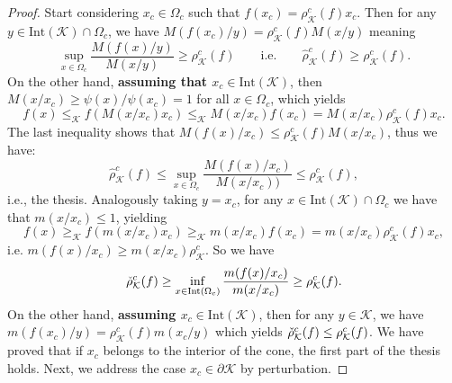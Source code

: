 \documentclass{article}
\newcommand{\cradius}{\rho_{\cone}}
\newcommand{\cgradius}{\widehat{\rho}_{\cone}}
\newcommand{\cdradius}{\Check{\rho}_{\cone}}
\newcommand{\cone}{\mathcal{K}}
\newcommand{\interior}{\mathrm{Int}}
\newcommand{\cgeq}{\geq_{\cone}}
\newcommand{\cleq}{\leq_{\cone}}
\begin{document}
%
\begin{proof}
Start considering $x_c\in \Omega_c$ such that $f(x_c)=\cradius^c(f) x_c$. Then for any $y\in \interior(\cone)\cap \Omega_c$, we have $M(f(x_c)/y)=\cradius^c(f)M(x/y)$ meaning
%
\begin{equation}\label{eq1_subhom_SR}
    \sup_{x\in \Omega_c}\frac{M(f(x)/y)}{M(x/y)}\geq \cradius^c(f) \qquad \text{i.e.} \qquad \cgradius^c(f)\geq \cradius^c(f).
\end{equation}
%
On the other hand, \textbf{assuming that $x_c\in \interior(\cone)$}, then $M(x/x_c)\geq \psi(x)/\psi(x_c)=1$ for all $x\in \Omega_c$, which yields
%
\begin{equation}
    f(x) \cleq f(M(x/x_c)x_c) \cleq M(x/x_c)f(x_c)= M(x/x_c)\cradius^c(f)x_c.
\end{equation}
%
The last inequality shows that $M(f(x)/x_c)\leq \cradius^c(f) M(x/x_c)$, thus we have:
%
\begin{equation}
    \cgradius^c(f)\leq \sup_{x\in \Omega_c}\frac{M(f(x)/x_c)}{M(x/x_c))}\leq \cradius^c(f),
\end{equation}
i.e., the thesis.
% 
Analogously taking $y=x_c$, for any $x\in\interior(\cone)\cap \Omega_c$ we have that $m(x/x_c)\leq 1$, yielding
%
\begin{equation}
    f(x)\cgeq f(m(x/x_c)x_c) \cgeq m(x/x_c)f(x_c) = m(x/x_c) \cradius^c(f) x_c,
\end{equation}
%
i.e. $m(f(x)/x_c)\geq m(x/x_c)\cradius^c $. So we have 
%
\begin{equation}\label{eq2_subhom_SR}
    \cdradius^c(f)\geq \inf_{x\in\interior(\Omega_c)}\frac{m(f(x)/x_c)}{m(x/x_c)}\geq \cradius^c(f).
\end{equation}
%
On the other hand, \textbf{assuming $x_c\in \interior(\cone)$}, then for any $y\in \cone$, we have $m(f(x_c)/y)=\cradius^c(f) m(x_c/y)$ which yields $\cdradius^c(f)\leq \cradius^c(f)$.
%
We have proved that if $x_c$ belongs to the interior of the cone, the first part of the thesis holds. Next, we address the case $x_c\in \partial\cone$ by perturbation.
%


\end{proof}
\end{document}
